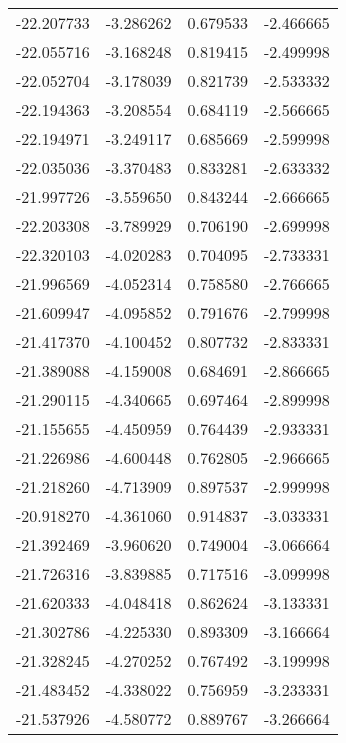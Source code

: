 \begin{tabular}{rrrr}
      -22.207733 &        -3.286262 &    0.679533 &  -2.466665 \\
      -22.055716 &        -3.168248 &    0.819415 &  -2.499998 \\
      -22.052704 &        -3.178039 &    0.821739 &  -2.533332 \\
      -22.194363 &        -3.208554 &    0.684119 &  -2.566665 \\
      -22.194971 &        -3.249117 &    0.685669 &  -2.599998 \\
      -22.035036 &        -3.370483 &    0.833281 &  -2.633332 \\
      -21.997726 &        -3.559650 &    0.843244 &  -2.666665 \\
      -22.203308 &        -3.789929 &    0.706190 &  -2.699998 \\
      -22.320103 &        -4.020283 &    0.704095 &  -2.733331 \\
      -21.996569 &        -4.052314 &    0.758580 &  -2.766665 \\
      -21.609947 &        -4.095852 &    0.791676 &  -2.799998 \\
      -21.417370 &        -4.100452 &    0.807732 &  -2.833331 \\
      -21.389088 &        -4.159008 &    0.684691 &  -2.866665 \\
      -21.290115 &        -4.340665 &    0.697464 &  -2.899998 \\
      -21.155655 &        -4.450959 &    0.764439 &  -2.933331 \\
      -21.226986 &        -4.600448 &    0.762805 &  -2.966665 \\
      -21.218260 &        -4.713909 &    0.897537 &  -2.999998 \\
      -20.918270 &        -4.361060 &    0.914837 &  -3.033331 \\
      -21.392469 &        -3.960620 &    0.749004 &  -3.066664 \\
      -21.726316 &        -3.839885 &    0.717516 &  -3.099998 \\
      -21.620333 &        -4.048418 &    0.862624 &  -3.133331 \\
      -21.302786 &        -4.225330 &    0.893309 &  -3.166664 \\
      -21.328245 &        -4.270252 &    0.767492 &  -3.199998 \\
      -21.483452 &        -4.338022 &    0.756959 &  -3.233331 \\
      -21.537926 &        -4.580772 &    0.889767 &  -3.266664 \\

\end{tabular}
